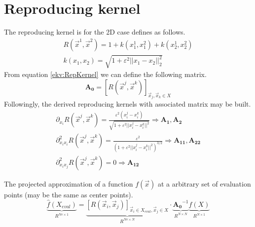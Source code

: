 \documentclass[a4paper]{article}      %
\begin{document}
\section*{Reproducing kernel}
The reproducing kernel is for the 2D case defines as follows.
\begin{equation}
	\begin{gathered}
	R(\vec{x}^1, \vec{x}^2) = 1 + k({x}^1_1, {x}^2_1) + k({x}^1_2, {x}^2_2) \\
	k(x_1, x_2) = \sqrt{1 + \varepsilon^2 ||x_1 - x_2||_2^2}
	\end{gathered}
	\label{ekv:RepKernel}
\end{equation}
From equation \ref{ekv:RepKernel} we can define the following matrix.
\begin{equation}
\mathbf{A_0} = \left[R(\vec{x}^j, \vec{x}^k)\right] _{\vec{x}_j,\vec{x}_k \in X} 
\label{ekv:A0}
\end{equation}
Followingly, the derived reproducing kernels with associated matrix may be built.
\begin{equation}
	\begin{gathered}
	\partial_{x_i} R(\vec{x}^j, \vec{x}^k) = \frac{\varepsilon^2(x_i^j - x_i^k)}{\sqrt{1 + \varepsilon^2||x_i^j - x_i^k||^2}} \Rightarrow  \mathbf{A_1}, \mathbf{A_2} \\[5pt]
	\partial^2_{x_ix_i} R(\vec{x}^j, \vec{x}^k) = \frac{\varepsilon^2}{(1 + \varepsilon^2||x_i^j - x_i^k||^2)^{3/2}} \Rightarrow  \mathbf{A_{11}}, \mathbf{A_{22}} \\[5pt]
	\partial^2_{x_ix_j} R(\vec{x}^j, \vec{x}^k) = 0  \Rightarrow \mathbf{A_{12}} \label{ekv:A12}
	\end{gathered}
\end{equation}

The projected approximation of a function $f(\vec{x})$ at a arbitrary set of evaluation points (may be the same as center points).
\begin{equation}
	\underbrace{\hat{f}(X_{eval})}_{R^{Ne \times 1}} =
	\underbrace{ 
	\left[R(\vec{x}_i, \vec{x}_j)  				\right]_{\vec{x}_i \in X_{eval}, \vec{x}_j \in X} 	}_{R^{Ne \times N}}	
	\cdot 
	\underbrace{
	\mathbf{A_0}^{-1}
	}_{R^{N\times N}}
	\underbrace{ 
	f(X)
	}_{R^{N \times 1 }}
	\label{ekv:EvalForm}
	\end{equation} 
\end{document}
